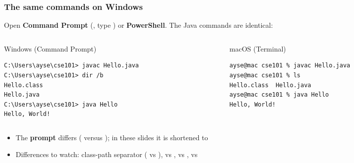 \documentclass[aspectratio=169,10pt,compress]{beamer}
\begin{document}
\begin{frame}[t,fragile] \frametitle{The same commands on Windows}
  \small Open \textbf{Command Prompt} (, type ) or \textbf{PowerShell}. The Java commands are identical:
  \begin{columns}[T]
    \begin{column}{0.48\textwidth}
      \begin{block}{Windows (Command Prompt)}


\begin{lstlisting}[style=codesnippet, language={}, basicstyle=\ttfamily\scriptsize]
C:\Users\ayse\cse101> javac Hello.java
C:\Users\ayse\cse101> dir /b
Hello.class
Hello.java
C:\Users\ayse\cse101> java Hello
Hello, World!
\end{lstlisting}


      \end{block}
    \end{column}
    \begin{column}{0.48\textwidth}
      \begin{block}{macOS (Terminal)}


\begin{lstlisting}[style=codesnippet, language=bash, basicstyle=\ttfamily\scriptsize]
ayse@mac cse101 % javac Hello.java
ayse@mac cse101 % ls
Hello.class  Hello.java
ayse@mac cse101 % java Hello
Hello, World!
\end{lstlisting}


      \end{block}
    \end{column}
  \end{columns}

  \vspace{0.2em}
  \begin{itemize}\small
    \item The \textbf{prompt} differs ( versus \hCode{\dots\ \%}); in these slides it is shortened to \hCode{\$}
    \item Differences to watch: class-path separator (\hCode{;} vs \hCode{:}),  vs ,  vs ,  vs 
  \end{itemize}
\end{frame}
\end{document}
